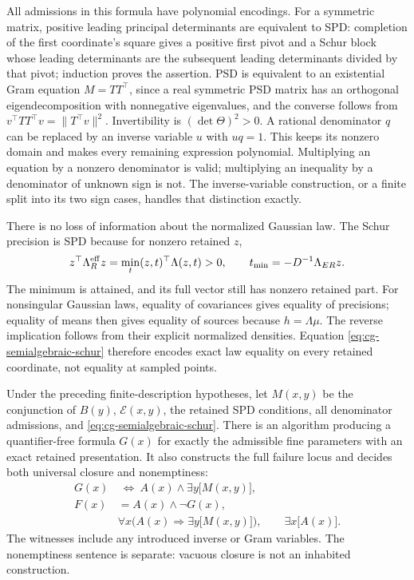 All admissions in this formula have polynomial encodings.
For a symmetric matrix, positive leading principal determinants are
equivalent to SPD: completion of the first coordinate's square gives
a positive first pivot and a Schur block whose leading determinants
are the subsequent leading determinants divided by that pivot;
induction proves the assertion. PSD is equivalent to an existential
Gram equation \(M=TT^\top\), since a real symmetric PSD matrix has an
orthogonal eigendecomposition with nonnegative eigenvalues, and the
converse follows from \(v^\top TT^\top v=\|T^\top v\|^2\).
Invertibility is \((\det\Theta)^2>0\). A rational denominator \(q\)
can be replaced by an inverse variable \(u\) with \(uq=1\).
This keeps its nonzero domain and makes every remaining expression
polynomial. Multiplying an equation by a nonzero denominator is valid;
multiplying an inequality by a denominator of unknown sign is not.
The inverse-variable construction, or a finite split into its two
sign cases, handles that distinction exactly.

There is no loss of information about the normalized Gaussian law.
The Schur precision is SPD because for nonzero retained \(z\),
\begin{equation}
z^\top\Lambda_R^{\rm eff}z
=\min_t (z,t)^\top\Lambda(z,t)>0,
\qquad
t_{\min}=-D^{-1}\Lambda_{ER}z.
\label{eq:cg-semialgebraic-schur-positive}
\end{equation}
The minimum is attained, and its full vector still has nonzero
retained part. For nonsingular Gaussian laws, equality of covariances
gives equality of precisions; equality of means then gives equality
of sources because \(h=\Lambda\mu\). The reverse implication follows
from their explicit normalized densities. Equation
\eqref{eq:cg-semialgebraic-schur} therefore encodes exact law equality
on every retained coordinate, not equality at sampled points.

Under the preceding finite-description hypotheses, let \(M(x,y)\)
be the conjunction of \(B(y)\), \(\mathcal E(x,y)\), the retained SPD conditions,
all denominator admissions, and
\eqref{eq:cg-semialgebraic-schur}. There is an algorithm producing a
quantifier-free formula \(G(x)\) for exactly the admissible fine
parameters with an exact retained presentation. It also constructs
the full failure locus and decides both universal closure and
nonemptiness:
\begin{equation}
\begin{aligned}
G(x)&\ \Longleftrightarrow\
 A(x)\wedge\exists y \bigl[M(x,y)\bigr],\\
F(x)&=A(x)\wedge\neg G(x),\\
&\forall x\bigl(A(x)\Rightarrow\exists y \bigl[M(x,y)\bigr]\bigr),
\qquad
\exists x \bigl[A(x)\bigr].
\end{aligned}
\label{eq:cg-semialgebraic-classification}
\end{equation}
The witnesses include any introduced inverse or Gram variables.
The nonemptiness sentence is separate: vacuous closure is not an
inhabited construction. \status{ESTABLISHED}

